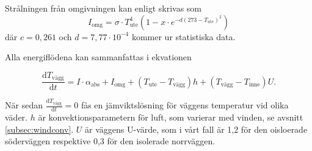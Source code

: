 Strålningen från omgivningen kan enligt \cite{bb_atmosphere} skrivas som 
\begin{equation}
I_\text{omg}=\sigma\cdot T_\text{ute}^4(1-x \cdot e^{-d(273-T_\text{ute})^2})
\end{equation}
där $c=0,261$ och $d=7,77\cdot10^{-4}$ kommer ur statistiska data.

Alla energiflödena kan sammanfattas i ekvationen 

\begin{equation}\boxed{ \; \; \;
\label{eq:ekvtemp}
\frac{\mathrm{d}T_\text{vägg}}{\mathrm{d}t} = 
I\cdot \alpha_\text{abs} + I_\text{omg} + (T_\text{ute} - T_\text{vägg}) h +( T_\text{vägg} - T_\text{inne} ) U.
\; \; \;}\end{equation}

När sedan $\frac{\mathrm{d}T_\text{vägg}}{\mathrm{d}t}=0$ fås en jämviktslösning för väggens temperatur vid olika väder. $h$ är konvektionsparametern för luft, som varierar med vinden, se avsnitt \ref{subsec:windconv}. $U$ är väggens U-värde, som i vårt fall är 1,2 för den oisloerade söderväggen respektive 0,3 för den isolerade norrväggen.
